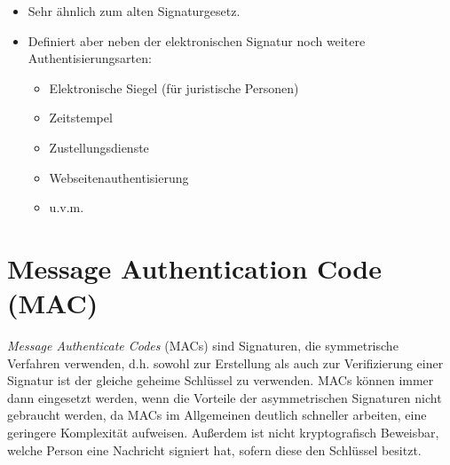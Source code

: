 \documentclass[a4paper, 11pt, accentcolor = tud3b]{tudreport}
\begin{document}
\begin{itemize}
\begin{itemize}
		        		\item Sehr ähnlich zum alten Signaturgesetz.
		        		\item Definiert aber neben der elektronischen Signatur noch weitere Authentisierungsarten:
			        		\begin{itemize}
			        			\item Elektronische Siegel (für juristische Personen)
			        			\item Zeitstempel
			        			\item Zustellungsdienste
			        			\item Webseitenauthentisierung
			        			\item u.v.m.
			        		\end{itemize}
		        	\end{itemize}
	        \end{itemize}

        \section{Message Authentication Code (MAC)}
            \textit{Message Authenticate Codes} (MACs) sind Signaturen, die symmetrische Verfahren verwenden, d.h. sowohl zur Erstellung als auch zur Verifizierung einer Signatur ist der gleiche geheime Schlüssel zu verwenden. MACs können immer dann eingesetzt werden, wenn die Vorteile der asymmetrischen Signaturen nicht gebraucht werden, da MACs im Allgemeinen deutlich schneller arbeiten, eine geringere Komplexität aufweisen. Außerdem ist nicht kryptografisch Beweisbar, welche Person eine Nachricht signiert hat, sofern diese den Schlüssel besitzt.
\end{document}
